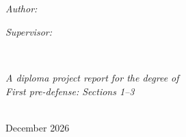 \documentclass[
11pt,
russian, %
english, %
singlespacing,
liststotoc,
headsepline,
]{MastersDoctoralThesis}
\author{Kiyalbek kyzy Jasmina}
\begin{document}
\frontmatter
\pagestyle{plain}


\begin{titlepage}
\begin{center}

\vspace*{.06\textheight}
{\scshape\LARGE \univname\par}\vspace{1.5cm}

\HRule \\[0.4cm]
{\huge \bfseries \ttitle\par}\vspace{0.4cm}
\HRule \\[1.5cm]

\begin{minipage}[t]{0.4\textwidth}
\begin{flushleft} \large
\emph{Author:}\\
\authorname
\end{flushleft}
\end{minipage}
\begin{minipage}[t]{0.4\textwidth}
\begin{flushright} \large
\emph{Supervisor:} \\
\supname
\end{flushright}
\end{minipage}\\[3cm]

\vfill

\large \textit{A diploma project report for the degree of \degreename}\\[0.3cm]
\textit{First pre-defense: Sections 1--3}\\[0.4cm]
\deptname\\[2cm]

\vfill

{\large December 2026}\\[4cm]

\vfill
\end{center}
\end{titlepage}

\end{document}
